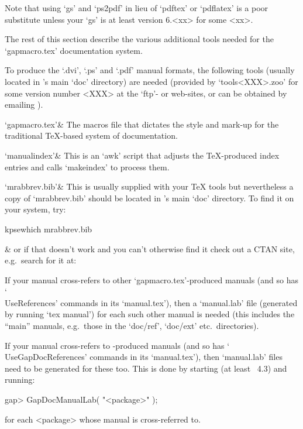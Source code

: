 Note that using `gs' and `ps2pdf' in lieu of `pdftex' or `pdflatex' is  a
poor substitute unless your `gs' is at  least  version  6.<xx>  for  some
<xx>.

The rest of this section describe the various additional tools needed for
the `gapmacro.tex' documentation system.

To produce the `.dvi', `.ps' and `.pdf'  manual  formats,  the  following
{\GAP} tools (usually located  in  {\GAP}'s  main  `doc'  directory)  are
needed (provided by `tools<XXX>.zoo' for some version number <XXX> at the
{\GAP}  `ftp'-  or  web-sites,   or   can   be   obtained   by   emailing
).

\beginitems

`gapmacro.tex'&
The macros file that dictates the style and mark-up for  the  traditional
{\TeX}-based system of {\GAP} documentation.

`manualindex'&
This is an `awk' script that adjusts the  {\TeX}-produced  index  entries
and calls `makeindex' to process them.

`mrabbrev.bib'&
This is usually supplied with your {\TeX} tools but nevertheless  a  copy
of `mrabbrev.bib' should be located in {\GAP}'s main `doc' directory.  To
find it on your system, try:

\begintt
kpsewhich mrabbrev.bib
\endtt

&
or if that doesn't work and you can't otherwise find it check out a  CTAN
site, e.g.~search for it at:

\enditems

If your manual cross-refers to other `gapmacro.tex'-produced manuals (and
so  has  `\\UseReferences'  commands  in  its   `manual.tex'),   then   a
`manual.lab' file (generated by running `tex manual') for each such other
manual is needed (this includes the ``main'' manuals, e.g.~those  in  the
`doc/ref', `doc/ext' etc.~directories).

If your manual cross-refers to -produced manuals (and  so
has  `\\UseGapDocReferences'  commands   in   its   `manual.tex'),   then
`manual.lab' files need to be generated for these too. This  is  done  by
starting {\GAP} (at least {\GAP}~4.3) and running:

gap> GapDocManualLab( "<package>" );

for each <package> whose manual is cross-referred to.


